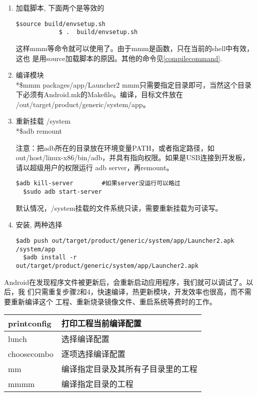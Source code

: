 \documentclass[a4paper,titlepage]{article}
\makeatletter
\newcommand{\tabcaption}{\def\@captype{table}\caption}
\makeatother
\begin{document}
\begin{enumerate}
    \item 加载脚本, 下面两个是等效的
        \begin{lstlisting}[numbers=none]
            $source build/envsetup.sh     
            $ .  build/envsetup.sh     
        \end{lstlisting}
        这样mmm等命令就可以使用了。由于mmm是函数，只在当前的shell中有效，这也
        是用source加载脚本的原因。其他的命令见\ref{compilecommand}.
    \item 编译模块
        \\*\$mmm packages/app/Launcher2
        mmm只需要指定目录即可，当然这个目录下必须有Android.mk的Makefile。编译，目标文件放在
        /out/target/product/generic/system/app。
    \item 重新挂载 /system
        \\*\$adb remount

        注意：把adb所在的目录放在环境变量PATH，或者指定路径，如out/host/linux-x86/bin/adb，并具有指向权限。如果是USB连接到开发板，请以超级用户的权限运行 adb server，再remount。
        \begin{lstlisting}[numbers=none]
  $adb kill-server        #如果server没运行可以略过
  $sudo adb start-server
        \end{lstlisting}
        默认情况，/system挂载的文件系统只读，需要重新挂载为可读写。
    \item 安装, 两种选择
      \begin{lstlisting}[numbers=none]
  $adb push out/target/product/generic/system/app/Launcher2.apk /system/app
  $adb install -r out/target/product/generic/system/app/Launcher2.apk
        \end{lstlisting}
\end{enumerate}

Android在发现程序文件被更新后，会重新启动应用程序，我们就可以调试了。以后，我
们只需重复步骤2和4，快速编译，热更新模块，开发效率也很高，而不需要重新编译这个
工程、重新烧录镜像文件、重启系统等费时的工作。 

\tabcaption{envsetup提供的编译工具 }\label{compilecommand}
\begin{tabular}{|l|l|}\hline
    printconfig & 打印工程当前编译配置\\\hline
    lunch       & 选择编译配置\\\hline
    choosecombo & 逐项选择编译配置\\\hline
    mm & 编译指定目录及其所有子目录里的工程\\\hline
    mmmm & 编译指定目录的工程\\\hline
\end{tabular}
\end{document}
